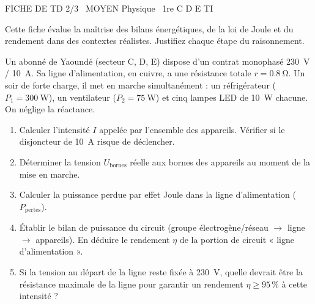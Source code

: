 \documentclass[11pt]{article}
\begin{document}
\begin{tcolorbox}[enhanced,colback=popink,colframe=popink,arc=10pt,boxrule=0pt,left=12pt,right=12pt,top=9pt,bottom=9pt]
{\color{white}\popxbold\small FICHE DE TD 2/3 \textbullet\ MOYEN \hfill Physique \textbullet\ 1re C D E TI\par}
\end{tcolorbox}
\vspace{4pt}
Cette fiche évalue la maîtrise des bilans énergétiques, de la loi de Joule et du rendement dans des contextes réalistes. Justifiez chaque étape du raisonnement.

\begin{exercice}
Un abonné de Yaoundé (secteur C, D, E) dispose d'un contrat monophasé \SI{230}{\volt} / \SI{10}{\ampere}. Sa ligne d'alimentation, en cuivre, a une résistance totale $r = \SI{0,8}{\ohm}$. Un soir de forte charge, il met en marche simultanément : un réfrigérateur ($P_1 = \SI{300}{\watt}$), un ventilateur ($P_2 = \SI{75}{\watt}$) et cinq lampes LED de \SI{10}{\watt} chacune. On néglige la réactance.
\begin{enumerate}
    \item Calculer l'intensité $I$ appelée par l'ensemble des appareils. Vérifier si le disjoncteur de \SI{10}{\ampere} risque de déclencher.
    \item Déterminer la tension $U_{\text{bornes}}$ réelle aux bornes des appareils au moment de la mise en marche.
    \item Calculer la puissance perdue par effet Joule dans la ligne d'alimentation ($P_{\text{pertes}}$).
    \item Établir le bilan de puissance du circuit (groupe électrogène/réseau $\rightarrow$ ligne $\rightarrow$ appareils). En déduire le rendement $\eta$ de la portion de circuit « ligne d'alimentation ».
    \item Si la tension au départ de la ligne reste fixée à \SI{230}{\volt}, quelle devrait être la résistance maximale de la ligne pour garantir un rendement $\eta \ge 95\,\%$ à cette intensité ?
\end{enumerate}
\end{exercice}
\end{document}

